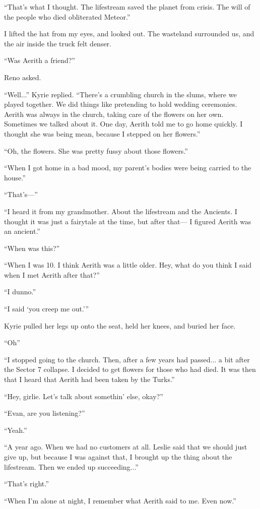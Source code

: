 \documentclass[oneside]{book}
\begin{document}
“That’s what I thought. The lifestream saved the planet from crisis. The will of the people who died obliterated Meteor.”

I lifted the hat from my eyes, and looked out. The wasteland surrounded us, and the air inside the truck felt denser.

“Was Aerith a friend?”

Reno asked.

“Well...” Kyrie replied. “There’s a crumbling church in the slums, where we played together. We did things like pretending to hold wedding ceremonies. Aerith was always in the church, taking care of the flowers on her own. Sometimes we talked about it. One day, Aerith told me to go home quickly. I thought she was being mean, because I stepped on her flowers.”

“Oh, the flowers. She was pretty fussy about those flowers.”

“When I got home in a bad mood, my parent’s bodies were being carried to the house.”

“That’s—”

“I heard it from my grandmother. About the lifestream and the Ancients. I thought it was just a fairytale at the time, but after that— I figured Aerith was an ancient.”

“When was this?”

“When I was 10. I think Aerith was a little older. Hey, what do you think I said when I met Aerith after that?”

“I dunno.”

“I said ‘you creep me out.’”

Kyrie pulled her legs up onto the seat, held her knees, and buried her face.

“Oh”

“I stopped going to the church. Then, after a few years had passed... a bit after the Sector 7 collapse. I decided to get flowers for those who had died. It was then that I heard that Aerith had been taken by the Turks.”

“Hey, girlie. Let’s talk about somethin’ else, okay?”

“Evan, are you listening?”

“Yeah.”

“A year ago. When we had no customers at all. Leslie said that we should just give up, but because I was against that, I brought up the thing about the lifestream. Then we ended up succeeding...”

“That’s right.”

“When I’m alone at night, I remember what Aerith said to me. Even now.”
\end{document}
